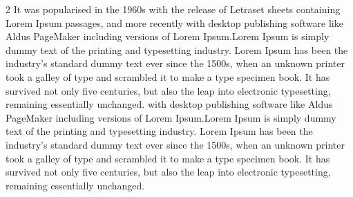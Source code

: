 \documentclass{article}
\begin{document}
\begin{multicols}{2}
    It was popularised in the 1960s with the release of Letraset sheets containing Lorem Ipsum passages, and more recently with desktop publishing software like Aldus PageMaker including versions of Lorem Ipsum.Lorem Ipsum is simply dummy text of the printing and typesetting industry. Lorem Ipsum has been the industry's standard dummy text ever since the 1500s, when an unknown printer took a galley of type and scrambled it to make a type specimen book. It has survived not only five centuries, but also the leap into electronic typesetting, remaining essentially unchanged. with desktop publishing software like Aldus PageMaker including versions of Lorem Ipsum.Lorem Ipsum is simply dummy text of the printing and typesetting industry. Lorem Ipsum has been the industry's standard dummy text ever since the 1500s, when an unknown printer took a galley of type and scrambled it to make a type specimen book. It has survived not only five centuries, but also the leap into electronic typesetting, remaining essentially unchanged. 

    \end{multicols}    
\end{document}
